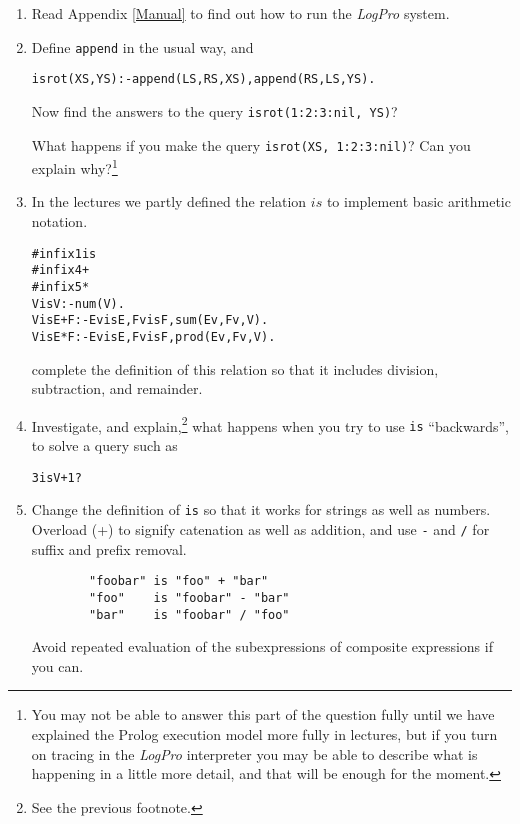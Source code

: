 \documentclass{article}
\def\LOGPRO{{\ttfamily\slshape LogPro}\xspace}
\newenvironment{smalltt}{\begin{small}\begin{alltt}}{\end{alltt}\end{small}}
\begin{document}
\begin{enumerate}
\item Read Appendix \ref{Manual} to find out how to run the \LOGPRO system.

\item Define {\tt append} in the usual way, and 
\begin{smalltt}
        isrot(XS, YS) :- append(LS, RS, XS), append(RS, LS, YS).
\end{smalltt}

Now find the answers to the query {\tt isrot(1:2:3:nil, YS)}?

What happens if you make the query  {\tt isrot(XS, 1:2:3:nil)}?
Can you explain why?\footnote{You may not be able to answer this
part of the question fully until we have explained the Prolog
execution model more fully in lectures, but if you turn on
tracing in the \LOGPRO interpreter you may be able to describe what is
happening in a little more detail, and that will be
enough for the moment.}


\item In the lectures we partly defined the relation $is$ to implement
basic arithmetic notation.
\begin{smalltt}
        #infix1 is
        #infix4 +
        #infix5 *
        V is V   :- num(V).
        V is E+F :- Ev is E, Fv is F, sum(Ev, Fv, V). 
        V is E*F :- Ev is E, Fv is F, prod(Ev, Fv, V). 
\end{smalltt}
complete the definition of this relation so that it includes division, subtraction, and 
remainder. 

\item Investigate, and explain,\footnote{See the previous footnote.} what happens when you try to use {\tt is}
``backwards'', to solve a query such as
\begin{smalltt}
        3 is V+1?
\end{smalltt}


\item Change the definition of {\tt is} so that it works for strings
as well as numbers. Overload (+) to signify catenation as well as addition, 
and use \verb.-. and \verb./. for suffix and prefix removal.  
\begin{verbatim}
        "foobar" is "foo" + "bar"
        "foo"    is "foobar" - "bar"
        "bar"    is "foobar" / "foo"
\end{verbatim}
Avoid repeated evaluation of the subexpressions of composite
expressions if you can. 
        
\begin{comment}
        #infix1 is
        #infix4 +
        #infix5 *
        V is V   :- num(V).
        V is V   :- str(V).
        V is E+F :- Ev is E, Fv is F, evplus(Ev, Fv, V). 
        V is E*F :- Ev is E, Fv is F, prod(Ev, Fv, V). 
        
        evplus(V1, V2, V) :- num(V1), num(V2), sum(V1, V2, V).
        evplus(V1, V2, V) :- str(V1), str(V2), cat(V1, V2, V).
\end{comment}


\end{enumerate}
\end{document}
